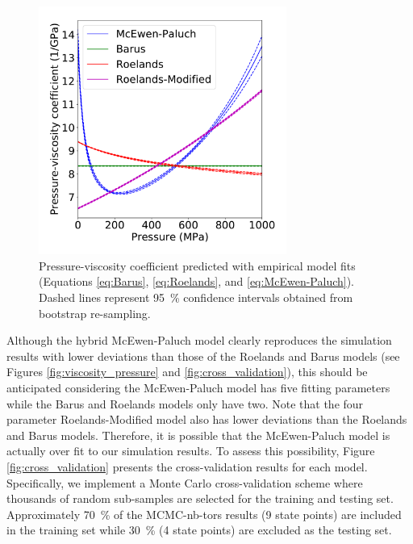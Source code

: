 \documentclass[preprint,review,12pt]{elsarticle}
\begin{document}
	\begin{figure}[htb!]
		\centering
		\includegraphics[width=3.2in]{Pressure_viscosity_coefficient.pdf}
		\caption{Pressure-viscosity coefficient predicted with empirical model fits (Equations \ref{eq:Barus}, \ref{eq:Roelands}, and \ref{eq:McEwen-Paluch}). Dashed lines represent 95~\% confidence intervals obtained from bootstrap re-sampling.}
		\label{fig:viscosity_pressure_coefficent}
	\end{figure}

	
	
	Although the hybrid McEwen-Paluch model clearly reproduces the simulation results with lower deviations than those of the Roelands and Barus models (see Figures \ref{fig:viscosity_pressure} and \ref{fig:cross_validation}), this should be anticipated considering the McEwen-Paluch model has five fitting parameters while the Barus and Roelands models only have two. Note that the four parameter Roelands-Modified model also has lower deviations than the Roelands and Barus models. Therefore, it is possible that the McEwen-Paluch model is actually over fit to our simulation results. To assess this possibility, Figure \ref{fig:cross_validation} presents the cross-validation results for each model. Specifically, we implement a Monte Carlo cross-validation scheme where thousands of random sub-samples are selected for the training and testing set. Approximately 70~\% of the MCMC-nb-tors results (9 state points) are included in the training set while 30~\% (4 state points) are excluded as the testing set. 
	
\end{document}
